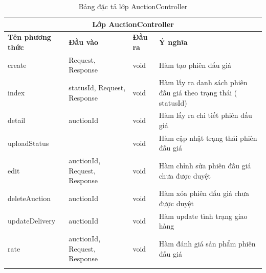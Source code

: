 \documentclass{article}
\begin{document}
    \begin{longtable}{| p{} | p{} | p{} | p{} |} 
    \hline
        \multicolumn{4}{|c|}{Lớp AuctionController}\\\hline
        \bfseries Tên phương thức & \bfseries Đầu vào & \bfseries Đầu ra & \bfseries Ý nghĩa  \\\hline
        create & Request, Response & void & Hàm tạo phiên đấu giá\\\hline
        index & statusId, Request, Response & void & Hàm lấy ra danh sách phiên đấu giá theo trạng thái ( statusId)\\\hline
        detail & auctionId & void & Hàm lấy ra chi tiết phiên đấu giá\\\hline
        uploadStatus & & void & Hàm cập nhật trạng thái phiên đấu giá\\\hline
        edit & auctionId, Request, Response & void & Hàm chỉnh sửa phiên đấu giá chưa được duyệt\\\hline
        deleteAuction & auctionId & void & Hàm xóa phiên đấu giá chưa được duyệt\\\hline
        updateDelivery & auctionId & void & Hàm update tình trạng giao hàng\\\hline
        rate & auctionId, Request, Response & void & Hàm đánh giá sản phẩm phiên đấu giá\\\hline
    \caption{Bảng đặc tả lớp AuctionController}
    \label{bang44}
    \end{longtable}
\end{document}

